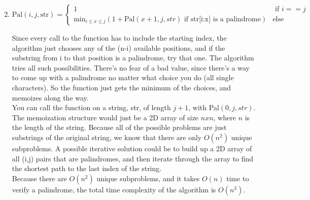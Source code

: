 
\usepackage{amsmath, verbatim, tikz, float, pgfplots, framed}
\usepackage[]{algorithm2e}

\usetikzlibrary{arrows,automata}

\oddsidemargin 0in
\evensidemargin 0in
\textwidth 6.5in
\topmargin -0.5in
\textheight 9.0in
\newcommand{\norm}[1]{\left\lVert #1 \right\rVert}


\pagestyle{myheadings}

\begin{enumerate}
  \setcounter{enumi}{1}
\item
  \begin{displaymath}
    \text{Pal}(i,j,\text{str}) = \left\{
      \begin{array}{lr}
        1 & \text { if } i == j\\
        \text{min}_{i \leq x \leq j}(1 + \text{Pal}(x+1,j,str) \text{ if str[i:x] is a palindrome}) & \text {else}
      \end{array}
      \right.
  \end{displaymath}

  Since every call to the function has to include the starting index, the algorithm just chooses any of the (n-i) available positions, and if the substring from i to that position is a palindrome, try that one. The algorithm tries all such possibilities. There's no fear of a bad value, since there's a way to come up with a palindrome no matter what choice you do (all single characters). So the function just gets the minimum of the choices, and memoizes along the way.\\
  
  You can call the function on a string, str, of length $j+1$, with Pal$(0,j,str)$.\\

  The memoization structure would just be a 2D array of size $nxn$, where $n$ is the length of the string. Because all of the possible problems are just substrings of the original string, we know that there are only $O(n^2)$ unique subproblems. A possible iterative solution could be to build up a 2D array of all (i,j) pairs that are palindromes, and then iterate through the array to find the shortest path to the last index of the string.\\

  Because there are $O(n^2)$ unique subproblems, and it takes $O(n)$ time to verify a palindrome, the total time complexity of the algorithm is $O(n^3)$.

\end{enumerate}
